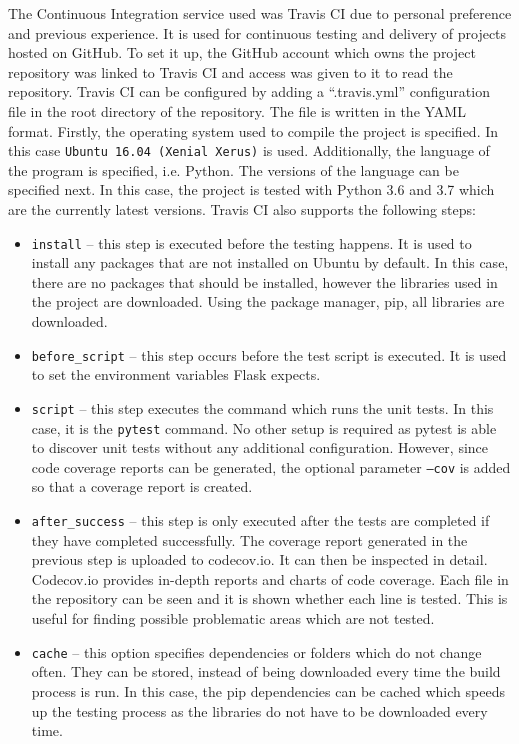 \documentclass[12pt,a4paper]{article}
\begin{document}
The Continuous Integration service used was Travis CI due to personal preference and previous experience. It is used for continuous testing and delivery of projects hosted on GitHub. To set it up, the GitHub account which owns the project repository was linked to Travis CI and access was given to it to read the repository. Travis CI can be configured by adding a “.travis.yml” configuration file in the root directory of the repository. The file is written in the YAML format. Firstly, the operating system used to compile the project is specified. In this case \texttt{Ubuntu 16.04 (Xenial Xerus)} is used. Additionally, the language of the program is specified, i.e. Python. The versions of the language can be specified next. In this case, the project is tested with Python 3.6 and 3.7 which are the currently latest versions. Travis CI also supports the following steps:
\begin{itemize}
    \item \texttt{install} – this step is executed before the testing happens. It is used to install any packages that are not installed on Ubuntu by default. In this case, there are no packages that should be installed, however the libraries used in the project are downloaded. Using the package manager, pip, all libraries are downloaded.
    \item \texttt{before\_script} – this step occurs before the test script is executed. It is used to set the environment variables Flask expects. 
    \item \texttt{script} – this step executes the command which runs the unit tests. In this case, it is the \texttt{pytest} command. No other setup is required as pytest is able to discover unit tests without any additional configuration. However, since code coverage reports can be generated, the optional parameter \texttt{--cov} is added so that a coverage report is created.
    \item \texttt{after\_success} – this step is only executed after the tests are completed if they have completed successfully. The coverage report generated in the previous step is uploaded to codecov.io. It can then be inspected in detail. Codecov.io provides in-depth reports and charts of code coverage. Each file in the repository can be seen and it is shown whether each line is tested. This is useful for finding possible problematic areas which are not tested. 
    \item \texttt{cache} – this option specifies dependencies or folders which do not change often. They can be stored, instead of being downloaded every time the build process is run. In this case, the pip dependencies can be cached which speeds up the testing process as the libraries do not have to be downloaded every time.
\end{itemize}
\end{document}
